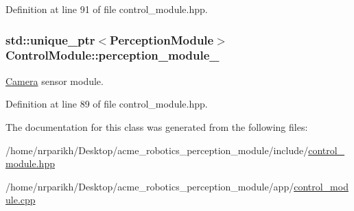 Definition at line 91 of file control\+\_\+module.\+hpp.

\subsubsection[{\texorpdfstring{perception\+\_\+module\+\_\+}{perception_module_}}]{\setlength{\rightskip}{0pt plus 5cm}std\+::unique\+\_\+ptr$<${\bf Perception\+Module}$>$ Control\+Module\+::perception\+\_\+module\+\_\+\hspace{0.3cm}{\ttfamily [private]}}\hypertarget{class_control_module_a179995b24b2400b72b2cfd079b576782}{}\label{class_control_module_a179995b24b2400b72b2cfd079b576782}


\hyperlink{class_camera}{Camera} sensor module. 



Definition at line 89 of file control\+\_\+module.\+hpp.



The documentation for this class was generated from the following files\+:\begin{DoxyCompactItemize}
\item 
/home/nrparikh/\+Desktop/acme\+\_\+robotics\+\_\+perception\+\_\+module/include/\hyperlink{control__module_8hpp}{control\+\_\+module.\+hpp}\item 
/home/nrparikh/\+Desktop/acme\+\_\+robotics\+\_\+perception\+\_\+module/app/\hyperlink{control__module_8cpp}{control\+\_\+module.\+cpp}\end{DoxyCompactItemize}
